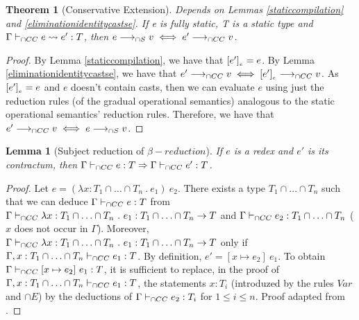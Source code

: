 \documentclass[a4paper]{article}
\newtheorem{theorem}{Theorem}
\newtheorem{lemma}{Lemma}
\begin{document}
\begin{theorem}[Conservative Extension]
\label{conservative_extension_operationalsemantics}
Depends on Lemmas \ref{staticcompilation} and \ref{eliminationidentitycastse}.
If e is fully static, T is a static type and $\Gamma \vdash_{\cap CC} e \leadsto e' : T$, then $e \longrightarrow_{\cap S} v \iff e' \longrightarrow_{\cap CC} v$.
\end{theorem}
\begin{proof}
By Lemma \ref{staticcompilation}, we have that $[e']_{_e} = e$.
By Lemma \ref{eliminationidentitycastse}, we have that $e' \longrightarrow_{\cap CC} v \iff [e']_{_e} \longrightarrow_{\cap CC} v$.
As $[e']_{_e} = e$ and $e$ doesn't contain casts, then we can evaluate $e$ using just the reduction rules (of the gradual operational semantics) analogous to the static operational semantics' reduction rules.
Therefore, we have that $e' \longrightarrow_{\cap CC} v \iff e \longrightarrow_{\cap S} v$.
\end{proof}

\begin{lemma}[Subject reduction of $\beta{-}reduction$]
\label{subjectreductionbeta}
If $e$ is a redex and $e'$ is its contractum, then $\Gamma \vdash_{\cap CC} e : T \Rightarrow \Gamma \vdash_{\cap CC} e' : T$.
\end{lemma}
\begin{proof}
Let $e = (\lambda x : T_1 \cap \ldots \cap T_n\ .\ e_1)\ e_2$.
There exists a type $T_1 \cap \ldots \cap T_n$ such that we can deduce $\Gamma \vdash_{\cap CC} e : T$ from $\Gamma \vdash_{\cap CC} \lambda x : T_1 \cap \ldots \cap T_n\ .\ e_1 : T_1 \cap \ldots \cap T_n \rightarrow T$ and $\Gamma \vdash_{\cap CC} e_2 : T_1 \cap \ldots \cap T_n$ ($x$ does not occur in $\Gamma$).
Moreover, $\Gamma \vdash_{\cap CC} \lambda x : T_1 \cap \ldots \cap T_n\ .\ e_1 : T_1 \cap \ldots \cap T_n \rightarrow T$ only if $\Gamma, x : T_1 \cap \ldots \cap T_n \vdash_{\cap CC} e_1 : T$.
By definition, $e' = [x \mapsto e_2]\ e_1$.
To obtain $\Gamma \vdash_{\cap CC} [x \mapsto e_2]\ e_1 : T$, it is sufficient to replace, in the proof of $\Gamma, x : T_1 \cap \ldots \cap T_n \vdash_{\cap CC} e_1 : T$, the statements $x : T_i$ (introduzed by the rules $Var$ and ${\cap}E$) by the deductions of $\Gamma \vdash_{\cap CC} e_2 : T_i$ for $1 \leq i \leq n$.
Proof adapted from \cite{coppo1980extension}.
\end{proof}
\end{document}
